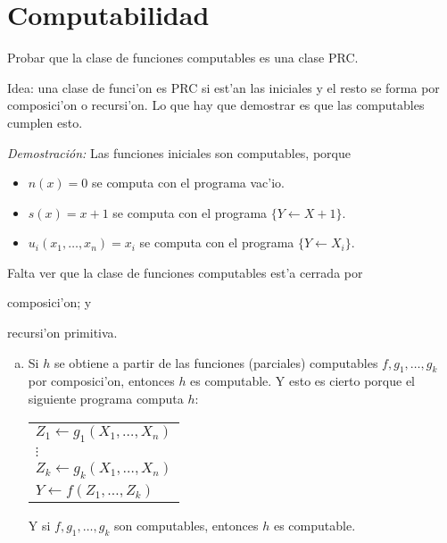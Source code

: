 
\section{Computabilidad}

\begin{questions}
\question Probar que la clase de funciones computables es una clase PRC.
\begin{solution}
  
  Idea: una clase de funci'on es PRC si est'an las iniciales y el resto se forma por composici'on o recursi'on. Lo que hay que demostrar es que las computables cumplen esto. 

  {\it Demostraci\'on: } Las funciones iniciales son computables, porque

  \begin{itemize}
  \item $n(x) = 0$ se computa con el programa vac'io. 
  \item $s(x) = x+1$ se computa con el programa $\{ Y \leftarrow X+1 \}$. 
  \item $u_i(x_1, \dots, x_n) = x_i$ se computa con el programa $\{ Y \leftarrow X_i \}$. 
  \end{itemize}

  Falta ver que la clase de funciones computables est'a cerrada por \begin{inparaenum}[(a)] \item composici'on; y \item recursi'on primitiva. \end{inparaenum}

  \begin{enumerate}[(a)]
  \item Si $h$ se obtiene a partir de las funciones (parciales) computables $f, g_1, \dots, g_k$ por composici'on, entonces $h$ es computable. Y esto es cierto porque el siguiente programa computa $h$: 
  
  \vspace{0.5cm}
  \begin{tabular}{l}
      $Z_1 \leftarrow g_1(X_1, \dots, X_n)$ \\
      $\vdots$ \\
      $Z_k \leftarrow g_k(X_1, \dots, X_n)$ \\
      $Y \leftarrow f(Z_1, \dots, Z_k)$
  \end{tabular}
  \vspace{0.5cm}
  
  Y si $f, g_1, \dots, g_k$ son computables, entonces $h$ es computable.
  

\end{enumerate}
\end{solution}
\end{questions}
